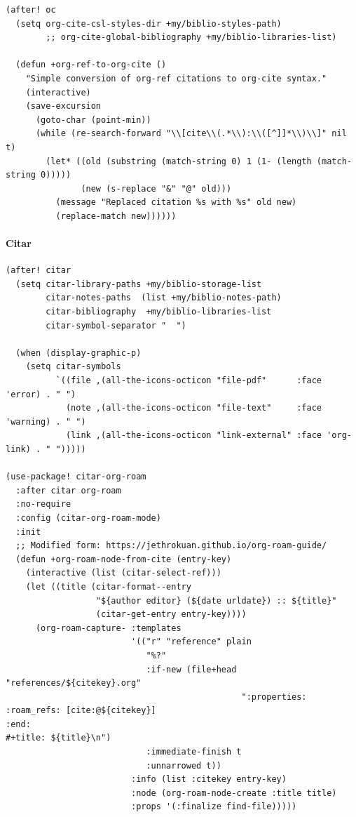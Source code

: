 \documentclass[11pt]{article}
\begin{document}
\begin{verbatim}
(after! oc
  (setq org-cite-csl-styles-dir +my/biblio-styles-path)
        ;; org-cite-global-bibliography +my/biblio-libraries-list)

  (defun +org-ref-to-org-cite ()
    "Simple conversion of org-ref citations to org-cite syntax."
    (interactive)
    (save-excursion
      (goto-char (point-min))
      (while (re-search-forward "\\[cite\\(.*\\):\\([^]]*\\)\\]" nil t)
        (let* ((old (substring (match-string 0) 1 (1- (length (match-string 0)))))
               (new (s-replace "&" "@" old)))
          (message "Replaced citation %s with %s" old new)
          (replace-match new))))))
\end{verbatim}

\paragraph{Citar}
\label{sec:org773cb54}

\begin{verbatim}
(after! citar
  (setq citar-library-paths +my/biblio-storage-list
        citar-notes-paths  (list +my/biblio-notes-path)
        citar-bibliography  +my/biblio-libraries-list
        citar-symbol-separator "  ")

  (when (display-graphic-p)
    (setq citar-symbols
          `((file ,(all-the-icons-octicon "file-pdf"      :face 'error) . " ")
            (note ,(all-the-icons-octicon "file-text"     :face 'warning) . " ")
            (link ,(all-the-icons-octicon "link-external" :face 'org-link) . " ")))))

(use-package! citar-org-roam
  :after citar org-roam
  :no-require
  :config (citar-org-roam-mode)
  :init
  ;; Modified form: https://jethrokuan.github.io/org-roam-guide/
  (defun +org-roam-node-from-cite (entry-key)
    (interactive (list (citar-select-ref)))
    (let ((title (citar-format--entry
                  "${author editor} (${date urldate}) :: ${title}"
                  (citar-get-entry entry-key))))
      (org-roam-capture- :templates
                         '(("r" "reference" plain
                            "%?"
                            :if-new (file+head "references/${citekey}.org"
                                               ":properties:
:roam_refs: [cite:@${citekey}]
:end:
#+title: ${title}\n")
                            :immediate-finish t
                            :unnarrowed t))
                         :info (list :citekey entry-key)
                         :node (org-roam-node-create :title title)
                         :props '(:finalize find-file)))))
\end{verbatim}
\end{document}
